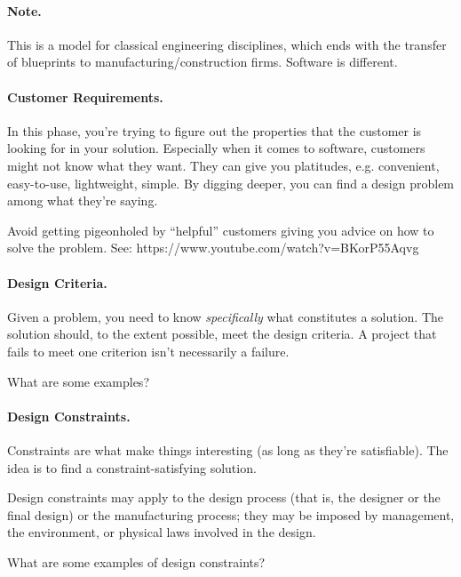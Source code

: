 \paragraph{Note.} This is a model for classical engineering
disciplines, which ends with the transfer of blueprints to
manufacturing/construction firms. Software is different.

\paragraph{Customer Requirements.} In this phase, you're trying to figure
out the properties that the customer is looking for in your solution.
Especially when it comes to software, customers might not know what
they want.  They can give you platitudes, e.g. convenient,
easy-to-use, lightweight, simple. By digging deeper, you can find a design
problem among what they're saying.

Avoid getting pigeonholed by ``helpful'' customers giving you advice on how to solve the problem. See: https://www.youtube.com/watch?v=BKorP55Aqvg

\paragraph{Design Criteria.} Given a problem, you need to know
\emph{specifically} what constitutes a solution. %
The solution should, to the extent possible, meet the design criteria.
A project that fails to meet one criterion isn't necessarily a failure.

{\sf What are some examples?}


\paragraph{Design Constraints.} Constraints are what make things interesting
(as long as they're satisfiable). The idea is to find a constraint-satisfying
solution.

Design constraints may apply to the design process (that is, the
designer or the final design) or the manufacturing process; they may
be imposed by management, the environment, or physical laws involved
in the design.

{\sf What are some examples of design constraints?}\\[4em]

